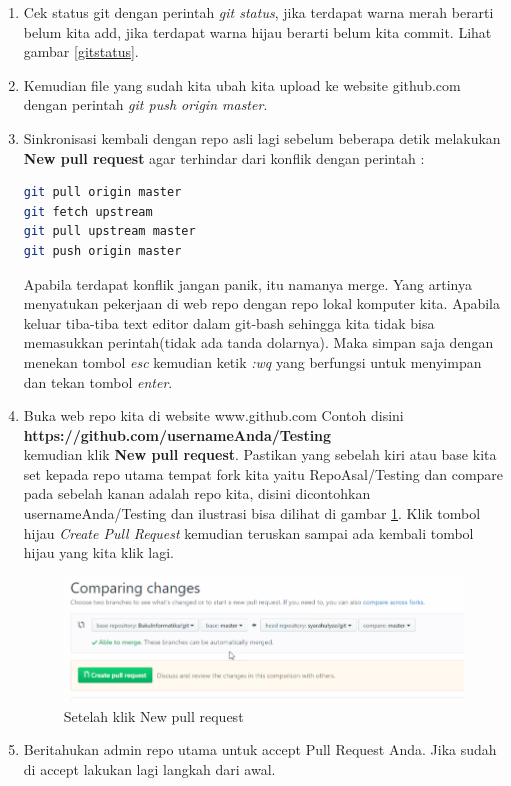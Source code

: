 \begin{enumerate}
\item Cek status git dengan perintah \textit{git status}, jika terdapat warna merah berarti belum kita add, jika terdapat warna hijau berarti belum kita commit. Lihat gambar \ref{gitstatus}.
\item Kemudian file yang sudah kita ubah kita upload ke website github.com dengan perintah \textit{git push origin master}.
\item Sinkronisasi kembali dengan repo asli lagi sebelum beberapa detik melakukan \textbf{New pull request} agar terhindar dari konflik dengan perintah :
\begin{lstlisting}[language=sh, caption=Perintah Sinkronisasi dengan repo asal,breaklines]
git pull origin master
git fetch upstream
git pull upstream master
git push origin master
\end{lstlisting}
Apabila terdapat konflik jangan panik, itu namanya merge. Yang artinya menyatukan pekerjaan di web repo dengan repo lokal komputer kita. Apabila keluar tiba-tiba text editor dalam git-bash sehingga kita tidak bisa memasukkan perintah(tidak ada tanda dolarnya). Maka simpan saja dengan menekan tombol \textit{esc} kemudian ketik \textit{:wq} yang berfungsi untuk menyimpan dan tekan tombol \textit{enter}.

\item Buka web repo kita di website www.github.com
Contoh disini\\
 \textbf{https://github.com/usernameAnda/Testing} \\kemudian klik \textbf{New pull request}. Pastikan yang sebelah kiri atau base kita set kepada repo utama tempat fork kita yaitu RepoAsal/Testing dan compare pada sebelah kanan adalah repo kita, disini dicontohkan usernameAnda/Testing dan ilustrasi bisa dilihat di gambar \ref{pullrequest}. Klik tombol hijau \textit{Create Pull Request} kemudian teruskan sampai ada kembali tombol hijau yang kita klik lagi.
\begin{figure}[!htbp]
\centerline{\includegraphics[width=.75\textwidth]{Figures/pullrequest}}
\caption{Setelah klik New pull request}
\label{pullrequest}
\end{figure}

\item Beritahukan admin repo utama untuk accept Pull Request Anda. Jika sudah di accept lakukan lagi langkah dari awal.
\end{enumerate}



